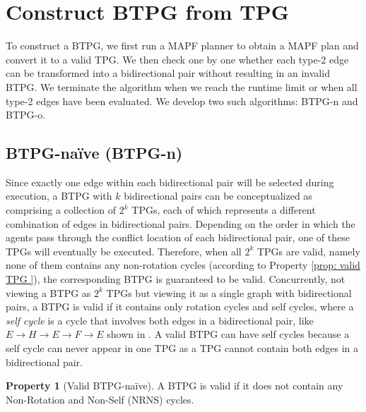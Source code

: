 \documentclass[letterpaper]{article} %
\theoremstyle{definition}
\newtheorem{property}{Property}
\begin{document}
\section{Construct BTPG from TPG}
To construct a BTPG, we first run a MAPF planner to obtain a MAPF plan and convert it to a valid TPG. We then check one by one whether each type-2 edge can be transformed into a bidirectional pair without resulting in an invalid BTPG. We terminate the algorithm when we reach the runtime limit or when all type-2 edges have been evaluated. We develop two such algorithms: BTPG-n and BTPG-o.

\subsection{BTPG-naïve (BTPG-n)}
Since exactly one edge within each bidirectional pair will be selected during execution, a BTPG with $k$ bidirectional pairs can be conceptualized as comprising a collection of $2^k$ TPGs, each of which represents a different combination of edges in bidirectional pairs. Depending on the order in which the agents pass through the conflict location of each bidirectional pair, one of these TPGs will eventually be executed. Therefore, when all $2^k$ TPGs are valid, namely none of them contains any non-rotation cycles (according to Property \ref{prop: valid TPG }), the corresponding BTPG is guaranteed to be valid. Concurrently, not viewing a BTPG as $2^k$ TPGs but viewing it as a single graph with bidirectional pairs, a BTPG is valid if it contains only rotation cycles and self cycles, where a \emph{self cycle} is a cycle that involves both edges in a bidirectional pair, like $E\rightarrow H \rightarrow E \rightarrow F \rightarrow E$ shown in . A valid BTPG can have self cycles because a self cycle can never appear in one TPG as a TPG cannot contain both edges in a bidirectional pair.

\begin{property}[Valid BTPG-naïve]
\label{prop: valid BTPG - naive}
    A BTPG is valid if it does not contain any Non-Rotation and Non-Self (NRNS) cycles.
\end{property}
\end{document}
